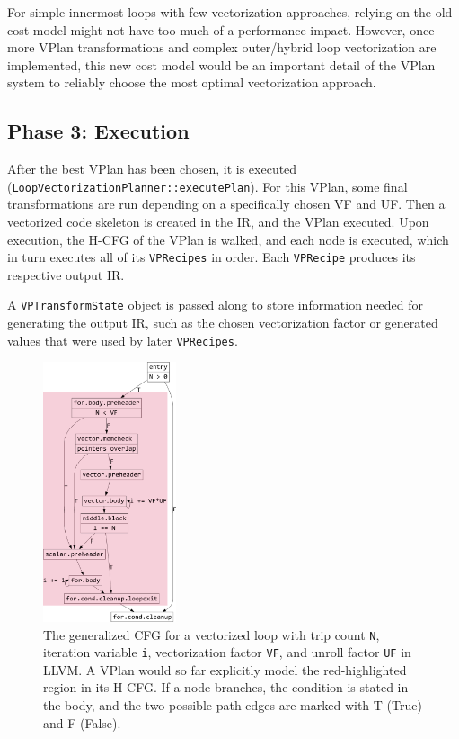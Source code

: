 \documentclass[sigplan,11pt,nonacm]{acmart}
\begin{document}
For simple innermost loops with few vectorization approaches,
relying on the old cost model might not have too much of a performance impact. 
However, once more VPlan transformations and complex
outer/hybrid loop vectorization are implemented, this new cost model would be an important
detail of the VPlan system to reliably choose the most optimal vectorization approach.

\subsection{Phase 3: Execution}
After the best VPlan has been chosen, it is executed (\texttt{LoopVectorizationPlanner::executePlan}).
For this VPlan, some final transformations are run depending on a specifically chosen VF and UF.
Then a vectorized code skeleton is created in the IR, and the VPlan executed. 
Upon execution, the H-CFG of the VPlan is walked, and each node is executed, which in turn executes all 
of its \texttt{VPRecipes} in order. Each \texttt{VPRecipe} produces its respective output IR.

A \texttt{VPTransformState} object is passed along to store information 
needed for generating the output IR, such as the chosen vectorization factor or generated values that were 
used by later \texttt{VPRecipes}.

\begin{figure}
  \centering
  \includegraphics[width=0.35\textwidth]{images/inner-loop-vec-loop-cfg-color.png}
  \caption{The generalized CFG for a vectorized loop with trip count \texttt{N}, 
  iteration variable \texttt{i}, vectorization factor \texttt{VF}, 
  and unroll factor \texttt{UF} in LLVM. A VPlan would so far explicitly model the red-highlighted 
  region in its H-CFG. If a node branches, the condition is stated in the body, and the two possible 
  path edges are marked with T (True) and F (False).}
  \label{fig:inner-loop-vec-cfg}
\end{figure}
\end{document}
